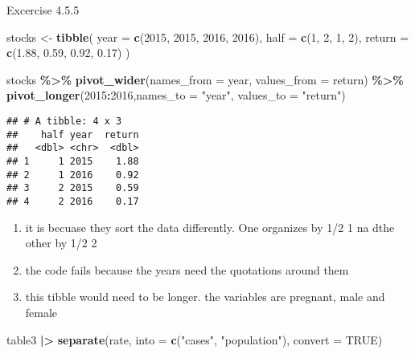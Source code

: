 \documentclass[
]{article}
\newenvironment{Shaded}{\begin{snugshade}}{\end{snugshade}}
\newcommand{\AttributeTok}[1]{\textcolor[rgb]{0.13,0.29,0.53}{#1}}
\newcommand{\ConstantTok}[1]{\textcolor[rgb]{0.56,0.35,0.01}{#1}}
\newcommand{\DecValTok}[1]{\textcolor[rgb]{0.00,0.00,0.81}{#1}}
\newcommand{\FloatTok}[1]{\textcolor[rgb]{0.00,0.00,0.81}{#1}}
\newcommand{\FunctionTok}[1]{\textcolor[rgb]{0.13,0.29,0.53}{\textbf{#1}}}
\newcommand{\NormalTok}[1]{#1}
\newcommand{\OtherTok}[1]{\textcolor[rgb]{0.56,0.35,0.01}{#1}}
\newcommand{\SpecialCharTok}[1]{\textcolor[rgb]{0.81,0.36,0.00}{\textbf{#1}}}
\newcommand{\StringTok}[1]{\textcolor[rgb]{0.31,0.60,0.02}{#1}}
\begin{document}
Excercise 4.5.5

\begin{Shaded}
\begin{Highlighting}[]
\NormalTok{stocks }\OtherTok{\textless{}{-}} \FunctionTok{tibble}\NormalTok{(}
  \AttributeTok{year =} \FunctionTok{c}\NormalTok{(}\DecValTok{2015}\NormalTok{, }\DecValTok{2015}\NormalTok{, }\DecValTok{2016}\NormalTok{, }\DecValTok{2016}\NormalTok{),}
  \AttributeTok{half =} \FunctionTok{c}\NormalTok{(}\DecValTok{1}\NormalTok{, }\DecValTok{2}\NormalTok{, }\DecValTok{1}\NormalTok{, }\DecValTok{2}\NormalTok{),}
  \AttributeTok{return =} \FunctionTok{c}\NormalTok{(}\FloatTok{1.88}\NormalTok{, }\FloatTok{0.59}\NormalTok{, }\FloatTok{0.92}\NormalTok{, }\FloatTok{0.17}\NormalTok{)}
\NormalTok{)}

\NormalTok{stocks }\SpecialCharTok{\%\textgreater{}\%}
  \FunctionTok{pivot\_wider}\NormalTok{(}\AttributeTok{names\_from =}\NormalTok{ year, }\AttributeTok{values\_from =}\NormalTok{ return) }\SpecialCharTok{\%\textgreater{}\%}
  \FunctionTok{pivot\_longer}\NormalTok{(}\StringTok{\textquotesingle{}2015\textquotesingle{}}\SpecialCharTok{:}\StringTok{\textquotesingle{}2016\textquotesingle{}}\NormalTok{,}\AttributeTok{names\_to =} \StringTok{"year"}\NormalTok{, }\AttributeTok{values\_to =} \StringTok{"return"}\NormalTok{)}
\end{Highlighting}
\end{Shaded}

\begin{verbatim}
## # A tibble: 4 x 3
##    half year  return
##   <dbl> <chr>  <dbl>
## 1     1 2015    1.88
## 2     1 2016    0.92
## 3     2 2015    0.59
## 4     2 2016    0.17
\end{verbatim}

\begin{enumerate}
\def\labelenumi{\arabic{enumi}.}
\item
  it is becuase they sort the data differently. One organizes by 1/2 1
  na dthe other by 1/2 2
\item
  the code fails because the years need the quotations around them
\item
  this tibble would need to be longer. the variables are pregnant, male
  and female
\end{enumerate}

\begin{Shaded}
\begin{Highlighting}[]
\NormalTok{table3 }\SpecialCharTok{|\textgreater{}}
  \FunctionTok{separate}\NormalTok{(rate, }\AttributeTok{into =} \FunctionTok{c}\NormalTok{(}\StringTok{"cases"}\NormalTok{, }\StringTok{"population"}\NormalTok{), }\AttributeTok{convert =} \ConstantTok{TRUE}\NormalTok{)}
\end{Highlighting}
\end{Shaded}
\end{document}
